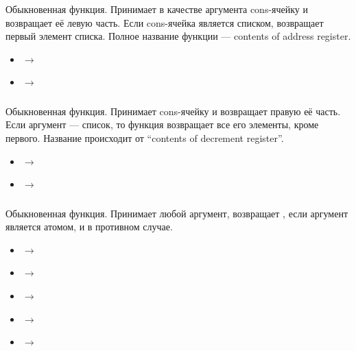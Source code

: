 \documentclass[a4paper, 12pt, titlepage, twoside]{article}
\newenvironment{examples}
               {\begin{itemize}\renewcommand{\labelitemi}{ }}
               {\end{itemize}}
\begin{document}
\subsubsection{}
Обыкновенная функция. Принимает в качестве аргумента cons-ячейку и возвращает её левую часть. Если cons-ячейка является списком, возвращает первый элемент списка. Полное название функции --- contents of address register.
\begin{examples}
\item {} $\longrightarrow$ 
\item {} $\longrightarrow$ 
\end{examples}
\subsubsection{}
Обыкновенная функция. Принимает cons-ячейку и возвращает правую её часть. Если аргумент --- список, то функция возвращает все его элементы, кроме первого. Название происходит от ``contents of decrement register''.
\begin{examples}
\item {} $\longrightarrow$ 
\item {} $\longrightarrow$ 
\end{examples}
\subsubsection{}
Обыкновенная функция. Принимает любой аргумент, возвращает , если аргумент является атомом, и  в противном случае.
\begin{examples}
\item {} $\longrightarrow$ 
\item {} $\longrightarrow$ 
\item {} $\longrightarrow$ 
\item {} $\longrightarrow$ 
\item {} $\longrightarrow$ 
\end{examples}
\end{document}
